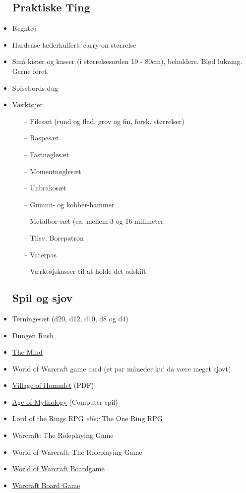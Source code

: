 \documentclass{article}
\begin{document}
\begin{itemize}
\subsection{Praktiske Ting}
    \item Regntøj
    \item Hardcase læderkuffert, carry-on størrelse
    \item Små kister og kasser (i størrelsesorden 10 - 80cm), beholdere. Blød lukning. Gerne foret.
    \item Spisebords-dug
    \item Værktøjer
        \begin{itemize}
            \item[--]   Filesæt (rund og flad, grov og fin, forsk. størrelser)
            \item[--]   Raspesæt
            \item[--]   Fastnøglesæt
            \item[--]   Momentnøglesæt
            \item[--] Unbrakosæt
            \item[--]   Gummi- og kobber-hammer
            \item[--]   Metalbor-sæt (ca. mellem 3 og 16 milimeter
            \item[--]   Tilsv. Borepatron
            \item[--]   Vaterpas
            \item[--]   Værktøjskasser til at holde det adskilt
        \end{itemize}
\subsection{Spil og sjov}
    \item Terningesæt (d20, d12, d10, d8 og d4)
    \item \href{https://boardgamegeek.com/boardgame/207338/dungeon-rush}{Dungen Rush}
    \item \href{https://www.boardgamegeek.com/boardgame/244992/mind}{The Mind}
    \item World of Warcraft game card (et par måneder ku' da være meget sjovt)
    \item \href{https://www.dmsguild.com/product/17067/T1-The-Village-of-Hommlet-1e}{Village of Hommlet} (PDF)
    \item \href{https://store.steampowered.com/app/266840/Age_of_Mythology_Extended_Edition/}{Age of Mythology} (Computer spil)
    \item Lord of the Rings RPG \textit{eller} The One Ring RPG
    \item Warcraft: The Roleplaying Game
    \item World of Warcraft: The Roleplaying Game
    \item \href{https://boardgamegeek.com/boardgame/17223/world-warcraft-boardgame}{World of Warcraft Boardgame}
    \item \href{https://boardgamegeek.com/boardgame/7479/warcraft-board-game}{Warcraft Board Game}
\end{itemize}
\end{document}
